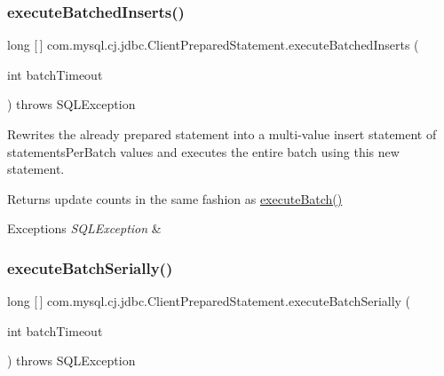 \subsubsection{\texorpdfstring{execute\+Batched\+Inserts()}{executeBatchedInserts()}}
{\footnotesize\ttfamily long \mbox{[}$\,$\mbox{]} com.\+mysql.\+cj.\+jdbc.\+Client\+Prepared\+Statement.\+execute\+Batched\+Inserts (\begin{DoxyParamCaption}\item[{int}]{batch\+Timeout }\end{DoxyParamCaption}) throws S\+Q\+L\+Exception\hspace{0.3cm}{\ttfamily [protected]}}

Rewrites the already prepared statement into a multi-\/value insert statement of \textquotesingle{}statements\+Per\+Batch\textquotesingle{} values and executes the entire batch using this new statement.

\begin{DoxyReturn}{Returns}
update counts in the same fashion as \mbox{\hyperlink{classcom_1_1mysql_1_1cj_1_1jdbc_1_1_statement_impl_a812ff94727864cc68fe96aaa38dbce6a}{execute\+Batch()}}
\end{DoxyReturn}

\begin{DoxyExceptions}{Exceptions}
{\em S\+Q\+L\+Exception} & \\
\hline
\end{DoxyExceptions}
\mbox{\label{classcom_1_1mysql_1_1cj_1_1jdbc_1_1_client_prepared_statement_a47a04fce09744ad87aa6889ef3193df7}} 
\subsubsection{\texorpdfstring{execute\+Batch\+Serially()}{executeBatchSerially()}}
{\footnotesize\ttfamily long \mbox{[}$\,$\mbox{]} com.\+mysql.\+cj.\+jdbc.\+Client\+Prepared\+Statement.\+execute\+Batch\+Serially (\begin{DoxyParamCaption}\item[{int}]{batch\+Timeout }\end{DoxyParamCaption}) throws S\+Q\+L\+Exception\hspace{0.3cm}{\ttfamily [protected]}}

